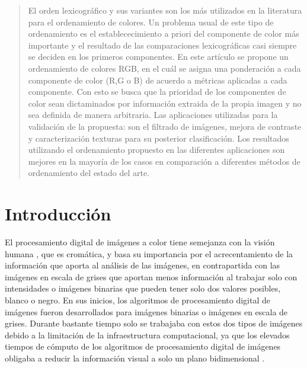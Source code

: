 \begin{abstract}
El orden lexicogr\'afico y sus variantes son los m\'as utilizados en la literatura para el ordenamiento de colores.  Un problema usual de este tipo de ordenamiento es el establececimiento a priori del componente de color m\'as importante y el resultado de las comparaciones lexicogr\'aficas casi siempre se deciden en los primeros componentes.  
En este art\'iculo se propone un  ordenamiento de colores RGB, en el cu\'al se asigna una ponderaci\'on a cada componente de color (R,G o B) de acuerdo a m\'etricas aplicadas a cada componente. Con esto se busca que la prioridad de los componentes de color sean dictaminados por información extraida de la propia imagen y no sea definida de manera arbitraria. Las aplicaciones utilizadas para la validación de la propuesta: son el filtrado de im\'agenes, mejora de contraste y caracterización texturas para su posterior clasificación. Los resultados utilizando el ordenamiento propuesto  en las diferentes aplicaciones son mejores en la mayor\'ia de los casos en comparaci\'on a diferentes m\'etodos de ordenamiento del estado del arte. 



\end{abstract}

\section{Introducci\'on}
\label{intro}
El procesamiento digital de im\'agenes a color tiene semejanza con la visi\'on humana \cite{roerdink2000watershed}, que es crom\'atica, y basa su importancia por el acrecentamiento de la informaci\'on que aporta al an\'alisis de las im\'agenes, en contrapartida con las im\'agenes en escala de grises que aportan menos informaci\'on al trabajar solo con intensidades o im\'agenes binarias que pueden tener solo dos valores posibles, blanco o negro. En sus inicios, los algoritmos de procesamiento digital de im\'agenes fueron desarrollados para im\'agenes binarias o im\'agenes en escala de grises. Durante bastante tiempo solo se trabajaba con estos dos tipos de im\'agenes debido a la limitaci\'on de la infraestructura computacional, ya que los elevados tiempos de c\'omputo de los algoritmos de procesamiento digital de im\'agenes obligaba a reducir la informaci\'on visual a solo un plano bidimensional \cite{ortiz2002procesamiento}.

